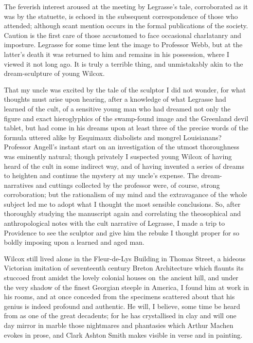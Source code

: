 The feverish interest aroused at the meeting by Legrasse's tale,
corroborated as it was by the statuette, is echoed in the subsequent
correspondence of those who attended; although scant mention occurs in
the formal publications of the society. Caution is the first care of
those accustomed to face occasional charlatanry and imposture. Legrasse
for some time lent the image to Professor Webb, but at the latter's
death it was returned to him and remains in his possession, where I
viewed it not long ago. It is truly a terrible thing, and unmistakably
akin to the dream-sculpture of young Wilcox.

\pagebreak

That my uncle was excited by the tale of the sculptor I did not wonder,
for what thoughts must arise upon hearing, after a knowledge of what
Legrasse had learned of the cult, of a sensitive young man who had
dreamed not only the figure and exact hieroglyphics of the swamp-found
image and the Greenland devil tablet, but had come in his dreams upon at
least three of the precise words of the formula uttered alike by
Esquimaux diabolists and mongrel Louisianans? Professor Angell's instant
start on an investigation of the utmost thoroughness was eminently
natural; though privately I suspected young Wilcox of having heard of
the cult in some indirect way, and of having invented a series of dreams
to heighten and continue the mystery at my uncle's expense. The
dream-narratives and cuttings collected by the professor were, of
course, strong corroboration; but the rationalism of my mind and the
extravagance of the whole subject led me to adopt what I thought the
most sensible conclusions. So, after thoroughly studying the manuscript
again and correlating the theosophical and anthropological notes with
the cult narrative of Legrasse, I made a trip to Providence to see the
sculptor and give him the rebuke I thought proper for so boldly imposing
upon a learned and aged man.

Wilcox still lived alone in the Fleur-de-Lys Building in Thomas Street,
a hideous Victorian imitation of seventeenth century Breton Architecture
which flaunts its stuccoed front amidst the lovely colonial houses on\est\
the ancient hill, and under the very shadow of the finest Georgian
steeple in America, I found him at work in his rooms, and at once
conceded from the specimens scattered about that his genius is indeed
profound and authentic. He will, I believe, some time be heard from as
one of the great decadents; for he has crystallised in clay and will one
day mirror in marble those nightmares and phantasies which Arthur Machen
evokes in prose, and Clark Ashton Smith makes visible in verse and in
painting.

